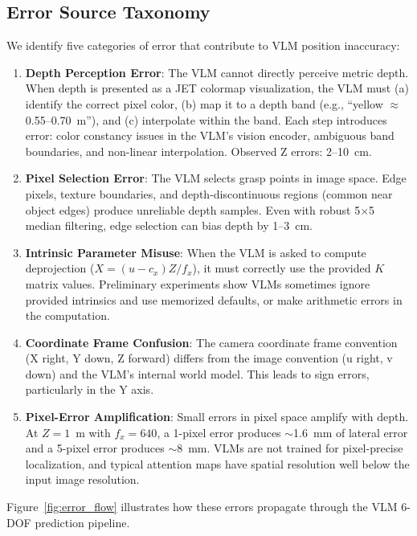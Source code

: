 \documentclass[11pt,a4paper]{article}
\begin{document}
\subsection{Error Source Taxonomy}

We identify five categories of error that contribute to VLM position inaccuracy:

\begin{enumerate}[label=\textbf{E\arabic*:}, leftmargin=*]
    \item \textbf{Depth Perception Error}: The VLM cannot directly perceive metric depth. When depth is presented as a JET colormap visualization, the VLM must (a) identify the correct pixel color, (b) map it to a depth band (e.g., ``yellow $\approx$ 0.55--0.70~m''), and (c) interpolate within the band. Each step introduces error: color constancy issues in the VLM's vision encoder, ambiguous band boundaries, and non-linear interpolation. Observed Z errors: 2--10~cm.
    \item \textbf{Pixel Selection Error}: The VLM selects grasp points in image space. Edge pixels, texture boundaries, and depth-discontinuous regions (common near object edges) produce unreliable depth samples. Even with robust 5$\times$5 median filtering, edge selection can bias depth by 1--3~cm.
    \item \textbf{Intrinsic Parameter Misuse}: When the VLM is asked to compute deprojection ($X = (u-c_x)Z/f_x$), it must correctly use the provided $K$ matrix values. Preliminary experiments show VLMs sometimes ignore provided intrinsics and use memorized defaults, or make arithmetic errors in the computation.
    \item \textbf{Coordinate Frame Confusion}: The camera coordinate frame convention (X right, Y down, Z forward) differs from the image convention (u right, v down) and the VLM's internal world model. This leads to sign errors, particularly in the Y axis.
    \item \textbf{Pixel-Error Amplification}: Small errors in pixel space amplify with depth. At $Z=1$~m with $f_x=640$, a 1-pixel error produces $\sim$1.6~mm of lateral error and a 5-pixel error produces $\sim$8~mm. VLMs are not trained for pixel-precise localization, and typical attention maps have spatial resolution well below the input image resolution.
\end{enumerate}

Figure~\ref{fig:error_flow} illustrates how these errors propagate through the VLM 6-DOF prediction pipeline.
\end{document}
